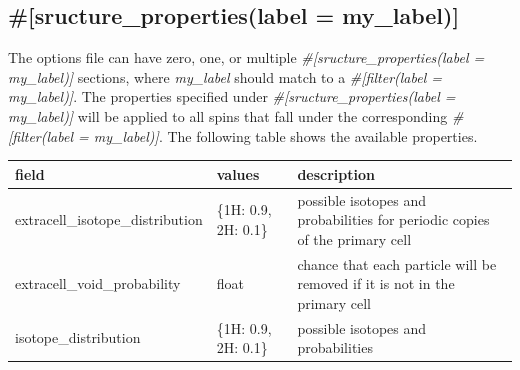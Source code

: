 \documentclass{book}
\begin{document}
\subsection{\#[sructure\_properties(label = my\_label)]}
The options file can have zero, one, or multiple 
\textit{\#[sructure\_properties(label = my\_label)]} sections,
where \textit{my\_label} should match to a 
\textit{\#[filter(label = my\_label)]}.
The properties specified under  
\textit{\#[sructure\_properties(label = my\_label)]} will be applied
to all spins that fall under the corresponding
\textit{\#[filter(label = my\_label)]}.
The following table shows the available properties.
\begin{center}
\begin{tabular}{| m{20em} | m{1.5cm}| m{7cm} |}
 \hline 
 \textbf{field} & \textbf{values} & \textbf{description} \\ 
 \hline 
 extracell\_isotope\_distribution & \{1H: 0.9, 2H: 0.1\} & 
 possible isotopes and probabilities for periodic copies of the primary cell\\
 \hline 
 extracell\_void\_probability & float & chance that each particle will be removed
 if it is not in the primary cell\\
 \hline 
 isotope\_distribution & \{1H: 0.9, 2H: 0.1\} & possible isotopes and
 probabilities\\
 \hline 
\end{tabular}
\end{center} 

\end{document}
